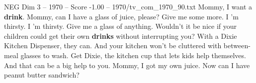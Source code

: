\begin{textsample}{NEG Dim 3 – 1970 – Score -1.00 – 1970/tv\_com\_1970\_90.txt}  \label{ex:f3_neg_062}
Mommy, I want a \textbf{drink}.
Mommy, can I have a glass of juice, please?
Give me some more.
I 'm thirsty.
I 'm thirsty.
Give me a glass of anything.
Wouldn't it be nice if your children could get their own \textbf{drinks} without interrupting you?
With a Dixie Kitchen Dispenser, they can.
And your kitchen won't be cluttered with between-meal glasses to wash.
Get Dixie, the kitchen cup that lets kids help themselves.
And that can be a big help to you.
Mommy, I got my own juice.
Now can I have peanut butter sandwich?

\end{textsample}
